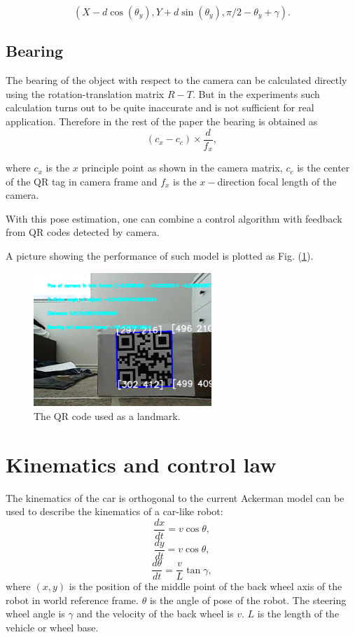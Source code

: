 \documentclass[12pt]{article}
\begin{document}
$$(X-d\cos(\theta_y),Y+d\sin(\theta_y),\pi/2-\theta_y+\gamma).$$
\subsection{Bearing}
The bearing of the object with respect to the camera can be calculated directly using the rotation-translation matrix $R-T$. But in the experiments such calculation turns out to be quite inaccurate and is not sufficient for real application. Therefore in the rest of the paper the bearing is obtained as $$(c_x-c_c)\times \frac{d}{f_x},$$

where $c_x$ is the $x$ principle point as shown in the camera matrix, $c_c$ is the center of the QR tag in camera frame and $f_x$ is the $x-$direction focal length of the camera.

With this pose estimation, one can combine a control algorithm with feedback from QR codes detected by camera.

A picture showing the performance of such model is plotted as  Fig. (\ref{QR}).

\begin{figure}[htbp]
\centering
\includegraphics[width=0.6\textwidth]{../figures/bearing_distance.png}
\caption{The QR code used as a landmark.}\label{QR}
\end{figure}

\section{Kinematics and control law}
\label{kine}
The kinematics of the car is orthogonal to the current 
Ackerman model can be used to describe the kinematics of a car-like robot: 
$$\frac{d x}{dt}=v\cos \theta,$$
$$\frac{d y}{dt}=v\cos \theta,$$
$$\frac{d \theta}{dt}=\frac{v}{L}\tan \gamma,$$
where $(x,y)$ is the position of the middle point of the back wheel axis of the robot in world reference frame. $\theta$ is the angle of pose of the robot. The steering wheel angle is $\gamma$ and the velocity of the back wheel is $v$. $L$ is the length of the vehicle or wheel base.
\end{document}
